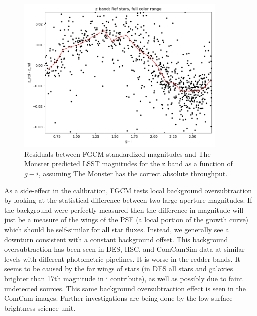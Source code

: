 \begin{figure}
  \begin{center}
    \includegraphics[width=0.9\textwidth]{photometric_calibration_figures/reference_residuals_z.png}
  \end{center}
  \caption{Residuals between FGCM standardized magnitudes and The Monster
    predicted LSST magnitudes for the z band as a function of $g-i$, assuming
    The Monster has the correct absolute throughput.}
\end{figure}


As a side-effect in the calibration, FGCM tests local background
oversubtraction by looking at the statistical difference between two large
aperture magnitudes.  If the background were perfectly measured then the
difference in magnitude will just be a measure of the wings of the PSF (a local
portion of the growth curve) which should be self-similar for all star fluxes.
Instead, we generally see a downturn consistent with a constant background
offset.  This background oversubtraction has been seen in DES, HSC, and
ComCamSim data at similar levels with different photometric pipelines.  It is
worse in the redder bands.  It seems to be caused by the far wings of stars (in
DES all stars and galaxies brighter than 17th magnitude in i contribute), as
well as possibly due to faint undetected sources.  This same background
oversubtraction effect is seen in the ComCam images.  Further investigations
are being done by the low-surface-brightness science unit.

